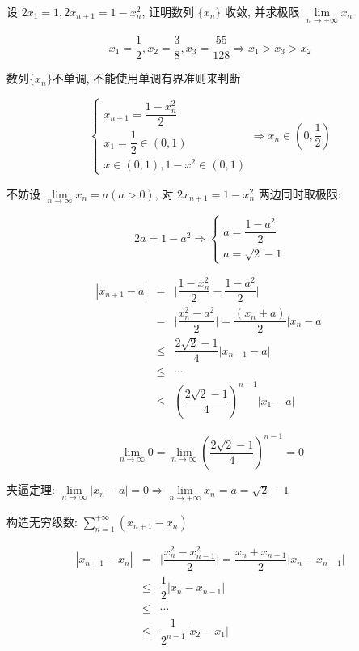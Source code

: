 \begin{proposition}
	设 $2x_{1}=1,2x_{n+1}=1-x_{n}^2$, 证明数列 $\{x_{n}\}$ 收敛,
	并求极限 $\lim\limits_{n\rightarrow +\infty}x_{n}$
\end{proposition}
\begin{solution}
	
	$$x_{1} = \dfrac{1}{2}, x_{2} = \dfrac{3}{8}, x_{3} = \dfrac{55}{128}\Rightarrow x_{1} > x_{3} > x_{2}$$
	
	数列$\{x_{n}\}$不单调, 不能使用单调有界准则来判断

	$$\begin{cases} 
		x_{n+1} = \dfrac{1-x_{n}^{2}}{2}\\
		x_{1} = \dfrac{1}{2}\in (0,1)\\
		x\in(0,1),1-x^{2}\in(0,1)
	\end{cases}\Rightarrow x_{n}\in (0,\dfrac{1}{2})$$
	\begin{anymark}[压缩映射原理]

		不妨设 $\lim\limits_{n\rightarrow\infty}x_{n}=a(a>0)$, 对 $2x_{n+1}=1-x_{n}^2$ 两边同时取极限: 
	    
		$$2a=1-a^2\Rightarrow 
		\begin{cases}
			a=\dfrac{1-a^2}{2} \\
			a=\sqrt{2}-1
		\end{cases}$$
			
		\begin{eqnarray*}
			|x_{n+1}-a| &  =   & \big|\dfrac{1-x_{n}^2}{2}-\dfrac{1-a^2}{2}\big|\\
					    &  =   & \big|\dfrac{x_{n}^{2}-a^2}{2}\big| = \dfrac{(x_{n}+a)}{2}|x_{n}-a|\\
					    & \leq & \dfrac{2\sqrt{2}-1}{4}|x_{n-1}-a|\\
					    & \leq & \cdots\\
					    & \leq & (\dfrac{2\sqrt{2}-1}{4})^{n-1}|x_{1}-a|
		\end{eqnarray*}
		
		$$\lim\limits_{n\to \infty} 0 = \lim\limits_{n\to \infty}(\dfrac{2\sqrt{2}-1}{4})^{n-1}=0$$
		
		夹逼定理: $\lim\limits_{n\to \infty}|x_{n}-a|=0 \Rightarrow \lim\limits_{n\rightarrow +\infty}x_{n} = a =\sqrt{2}-1$
	\end{anymark}
	\begin{anymark}[柯西列]

		构造无穷级数: $\sum\limits_{n=1}^{+\infty}(x_{n+1}-x_{n})$
		
		\begin{eqnarray*}
			|x_{n+1}-x_{n}| &   =  & \big|\dfrac{x_{n}^2-x_{n-1}^2}{2}\big| = \dfrac{x_{n}+x_{n-1}}{2}|x_{n}-x_{n-1}|\\
					  		& \leq & \dfrac{1}{2}|x_{n}-x_{n-1}|\\
					  		& \leq & \cdots\\
					  		& \leq & \dfrac{1}{2^{n-1}}|x_{2}-x_{1}|
		\end{eqnarray*}
		

\end{anymark}
\end{solution}
